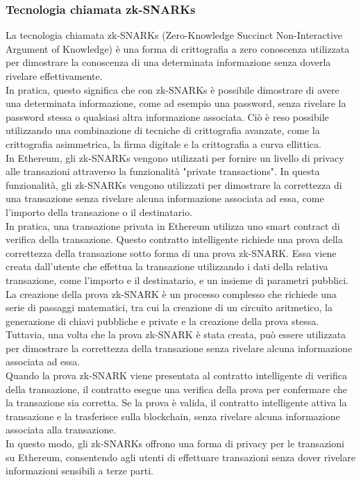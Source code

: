 \documentclass[a4paper,11pt]{report}
\begin{document}
\subsubsection{Tecnologia chiamata zk-SNARKs}
La tecnologia chiamata zk-SNARKs (Zero-Knowledge Succinct Non-Interactive Argument of Knowledge) è una forma di crittografia a zero conoscenza utilizzata per dimostrare la conoscenza di una determinata informazione senza doverla rivelare effettivamente.\\ In pratica, questo significa che con zk-SNARKs è possibile dimostrare di avere una determinata informazione, come ad esempio una password, senza rivelare la password stessa o qualsiasi altra informazione associata. Ciò è reso possibile utilizzando una combinazione di tecniche di crittografia avanzate, come la crittografia asimmetrica, la firma digitale e la crittografia a curva ellittica.\\
In Ethereum, gli zk-SNARKs vengono utilizzati per fornire un livello di privacy alle transazioni attraverso la funzionalità "private transactions". In questa funzionalità, gli zk-SNARKs vengono utilizzati per dimostrare la correttezza di una transazione senza rivelare alcuna informazione associata ad essa, come l'importo della transazione o il destinatario.\\ In pratica, una transazione privata in Ethereum utilizza uno smart contract di verifica della transazione. Questo contratto intelligente richiede una prova della correttezza della transazione sotto forma di una prova zk-SNARK. Essa viene creata dall'utente che effettua la transazione utilizzando i dati della relativa transazione, come l'importo e il destinatario, e un insieme di parametri pubblici.\\ La creazione della prova zk-SNARK è un processo complesso che richiede una serie di passaggi matematici, tra cui la creazione di un circuito aritmetico, la generazione di chiavi pubbliche e private e la creazione della prova stessa. Tuttavia, una volta che la prova zk-SNARK è stata creata, può essere utilizzata per dimostrare la correttezza della transazione senza rivelare alcuna informazione associata ad essa.\\
Quando la prova zk-SNARK viene presentata al contratto intelligente di verifica della transazione, il contratto esegue una verifica della prova per confermare che la transazione sia corretta. Se la prova è valida, il contratto intelligente attiva la transazione e la trasferisce sulla blockchain, senza rivelare alcuna informazione associata alla transazione.\\
In questo modo, gli zk-SNARKs offrono una forma di privacy per le transazioni su Ethereum, consentendo agli utenti di effettuare transazioni senza dover rivelare informazioni sensibili a terze parti.
\end{document}
